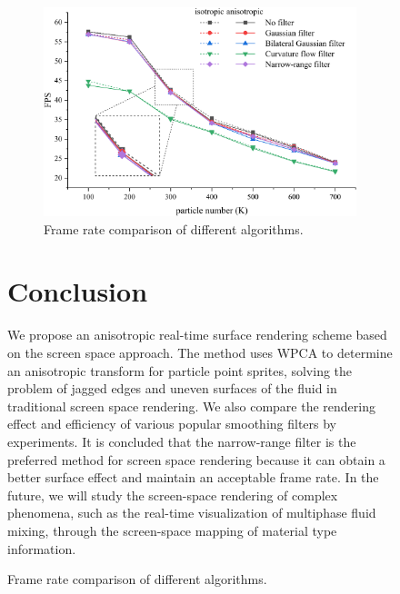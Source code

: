 \documentclass[times,twocolumn,final]{elsarticle}
\providecommand{\DIFdelbegin}{} %
\providecommand{\DIFaddbeginFL}{} %
\providecommand{\DIFaddendFL}{} %
\providecommand{\DIFdelbeginFL}{} %
\providecommand{\DIFdelendFL}{} %
\begin{document}
\begin{figure}[!t]
\begin{figure}[!t]
    \centering
    \includegraphics[width=\linewidth]{figs/FPS.png}
    \caption{Frame rate comparison of different algorithms.}
    \label{fig:figure8}
\end{figure}

\section{Conclusion}
We propose an anisotropic real-time surface rendering scheme based on the screen space approach. The method uses WPCA to determine an anisotropic transform for particle point sprites, solving the problem of jagged edges and uneven surfaces of the fluid in traditional screen space rendering. We also compare the rendering effect and efficiency of various popular smoothing filters by experiments. It is concluded that the narrow-range filter is the preferred method for screen space rendering because it can obtain a better surface effect and maintain an acceptable frame rate. In the future, we will study the screen-space rendering of complex phenomena, such as the real-time visualization of multiphase fluid mixing, through the screen-space mapping of material type information.
\DIFdelbegin %


\end{figure}
\end{document}
